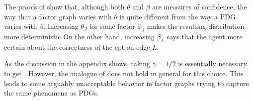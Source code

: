 \documentclass{article}
\theoremstyle{plain}
\theoremstyle{definition}
\theoremstyle{remark}
\newcommand{\commentout}[1]{\ignorespaces}
\numberwithin{equation}{section}
\begin{document}
The proofs of  show that, although
both $\theta$ and $\beta$ are measures of confidence, the way that 
a factor graph varies with $\theta$  
is quite different from the way a PDG varies with $\beta$. Increasing
$\theta_J$ for some factor $\phi_J$ makes the resulting distribution
more deterministic
\commentout{
	(more precisely, the probabilities of the most probable tuples $\vec{x}_J$ 
		increase, while the
	probabilities of the least probable ones decrease).} 
 On the other hand,
increasing $\beta_L$ says that the agent more certain about the
correctness of the cpt on edge $L$.


As the discussion in the appendix shows, taking $\gamma = 1/2$ is
essentially necessary to get .
However, the analogue of  does not hold
in general for this choice.  This leads to some arguably unacceptable
behavior in factor graphs trying to capture the same phenomena as PDGs.
\end{document}

